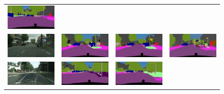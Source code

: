 \documentclass[10pt,twocolumn,letterpaper]{article}
\begin{document}
\begin{figure}[h]
\begin{tabular}{cccc}
\includegraphics[width=0.25\linewidth]{figs/cityscapes_image_to_labels_latex/cGAN_frankfurt_000001_044525_leftImg8bit.jpg} \\
\includegraphics[width=0.25\linewidth]{figs/cityscapes_image_to_labels_latex/input_munster_000113_000019_leftImg8bit.jpg} &
\includegraphics[width=0.25\linewidth]{figs/cityscapes_image_to_labels_latex/gt_munster_000113_000019_leftImg8bit.jpg} &
\includegraphics[width=0.25\linewidth]{figs/cityscapes_image_to_labels_latex/L1_munster_000113_000019_leftImg8bit.jpg} &
\includegraphics[width=0.25\linewidth]{figs/cityscapes_image_to_labels_latex/cGAN_munster_000113_000019_leftImg8bit.jpg} \\
\includegraphics[width=0.25\linewidth]{figs/cityscapes_image_to_labels_latex/input_frankfurt_000000_004617_leftImg8bit.jpg} &
\includegraphics[width=0.25\linewidth]{figs/cityscapes_image_to_labels_latex/gt_frankfurt_000000_004617_leftImg8bit.jpg} &
\includegraphics[width=0.25\linewidth]{figs/cityscapes_image_to_labels_latex/L1_frankfurt_000000_004617_leftImg8bit.jpg} &

\end{tabular}
\end{figure}
\end{document}
